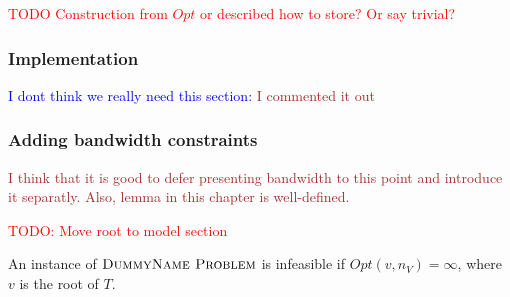 \documentclass[9pt,twocolumn]{scrartcl}
\newcommand{\Problem}{\textsc{DummyName Problem}}
\newcommand{\carlo}[1]{\textcolor{red}{#1}}
\newcommand{\maciek}[1]{\textcolor{brown}{#1}}
\newcommand{\stefan}[1]{\textcolor{blue}{#1}}
\newcommand{\SubstrateNode}{\ensuremath{v}}
\newcommand{\Opt}{\ensuremath{Opt}}
\newcommand{\ChunkCount}{\ensuremath{\textsc{cis}}}
\newcommand{\VmCount}{\ensuremath{\textsc{vis}}}
\newcommand{\Tree}{\ensuremath{T}}
\newcommand{\Vms}{\ensuremath{n_V}}
\begin{document}
\carlo{TODO Construction from $\Opt$ or described how to store? Or say trivial?}

\subsubsection{Implementation}

\stefan{I dont think we really need this section:}
\maciek{I commented it out}

\subsubsection{Adding bandwidth constraints}

\maciek{I think that it is good to defer presenting bandwidth to this point and introduce it separatly. Also, lemma in this chapter is well-defined.}

\carlo{TODO: Move root to model section}

\begin{lemma}
An instance of $\Problem$ is infeasible if $\Opt(\SubstrateNode,\Vms) = \infty$,
where $\SubstrateNode$ is the root of $\Tree$.
\end{lemma}
\end{document}
